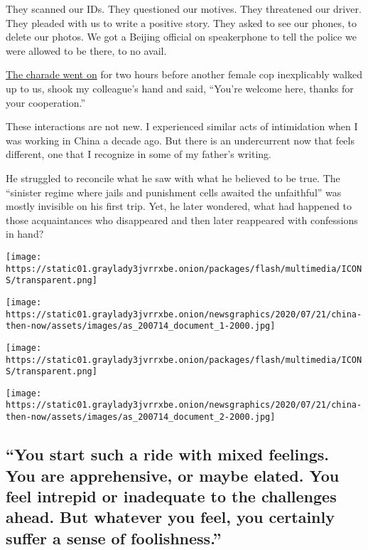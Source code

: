 They scanned our IDs. They questioned our motives. They threatened our
driver. They pleaded with us to write a positive story. They asked to
see our phones, to delete our photos. We got a Beijing official on
speakerphone to tell the police we were allowed to be there, to no
avail.

\href{https://www.nytimes3xbfgragh.onion/2019/11/10/business/china-reporter-police.html}{The
charade went on} for two hours before another female cop inexplicably
walked up to us, shook my colleague's hand and said, ``You're welcome
here, thanks for your cooperation.''

These interactions are not new. I experienced similar acts of
intimidation when I was working in China a decade ago. But there is an
undercurrent now that feels different, one that I recognize in some of
my father's writing.

He struggled to reconcile what he saw with what he believed to be true.
The ``sinister regime where jails and punishment cells awaited the
unfaithful'' was mostly invisible on his first trip. Yet, he later
wondered, what had happened to those acquaintances who disappeared and
then later reappeared with confessions in hand?

\texttt{[image: https://static01.graylady3jvrrxbe.onion/packages/flash/multimedia/ICONS/transparent.png]}

\texttt{[image: https://static01.graylady3jvrrxbe.onion/newsgraphics/2020/07/21/china-then-now/assets/images/as\_200714\_document\_1-2000.jpg]}

\texttt{[image: https://static01.graylady3jvrrxbe.onion/packages/flash/multimedia/ICONS/transparent.png]}

\texttt{[image: https://static01.graylady3jvrrxbe.onion/newsgraphics/2020/07/21/china-then-now/assets/images/as\_200714\_document\_2-2000.jpg]}

\hypertarget{you-start-such-a-ride-with-mixed-feelings-you-are-apprehensive-or-maybe-elated-you-feel-intrepid-or-inadequate-to-the-challenges-ahead-but-whatever-you-feel-you-certainly-suffer-a-sense-of-foolishness}{%
\subsection{``You start such a ride with mixed feelings. You are
apprehensive, or maybe elated. You feel intrepid or inadequate to the
challenges ahead. But whatever you feel, you certainly suffer a sense of
foolishness.''}\label{you-start-such-a-ride-with-mixed-feelings-you-are-apprehensive-or-maybe-elated-you-feel-intrepid-or-inadequate-to-the-challenges-ahead-but-whatever-you-feel-you-certainly-suffer-a-sense-of-foolishness}}

